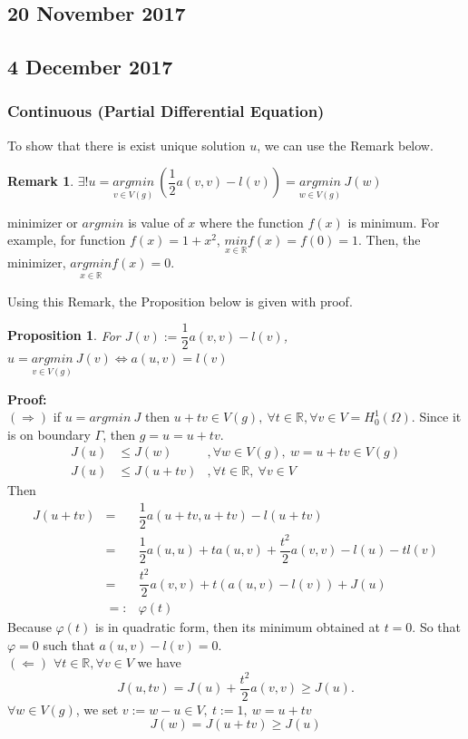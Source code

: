 \documentclass[a4paper,10pt]{article}
\newtheorem{remark}{Remark}[]
\newtheorem{prop}{Proposition}
\begin{document}
\subsection{20 November 2017}

\subsection{4 December 2017}

\subsubsection{Continuous (Partial Differential Equation)}
To show that there is exist unique solution $ u $, we can use the Remark below. 
\begin{remark}
	$ \exists ! u = \underset{v \in V(g)}{argmin} \ (\dfrac{1}{2} a(v,v)-l(v)) = \underset{w \in V(g)}{argmin} \ J(w)$
\end{remark}

minimizer or $ argmin $ is value of $ x $ where the function $ f(x) $ is minimum. For example, for function $ f(x)=1+x^2 $, $ \underset{x \in \mathbb{R}}{min} f(x) = f(0) =1 $. Then, the minimizer, $ \underset{x \in \mathbb{R}}{argmin} f(x) = 0 $.

Using this Remark, the Proposition below is given with proof.
\begin{prop}
	For $ J(v) := \dfrac{1}{2} a(v,v) -l (v) $,
	$ u = \underset{v \in V(g)}{argmin} \ J(v) \iff a(u,v)=l(v) $
\end{prop}

\textbf{Proof:}\\
$ (\Rightarrow) $ if $ u = argmin \ J $ then $ u+tv \in V(g) , \ \forall t \in \mathbb{R}, \forall v \in V = H_{0}^{1} (\Omega) $. Since it is on boundary $ \Gamma $, then $ g=u=u+tv $.
\begin{eqnarray}\nonumber
J(u) &\leq J(w) &, \forall w \in V(g), \ w=u+tv \in V(g)\\ \nonumber
J(u) &\leq J(u+tv) &, \forall t \in \mathbb{R}, \ \forall v \in V
\end{eqnarray}
Then
\begin{eqnarray}\nonumber
J(u+tv) &=& \dfrac{1}{2} a(u+tv,u+tv)-l(u+tv)\\ \nonumber
&=& \dfrac{1}{2} a(u,u) + t a(u,v) + \dfrac{t^2}{2} a (v,v) - l(u) - t l(v)\\ \nonumber
&=& \dfrac{t^2}{2} a (v,v) + t (a(u,v) - l(v)) + J(u)\\ \nonumber
&=:& \varphi(t)
\end{eqnarray}
Because $ \varphi(t) $ is in quadratic form, then its minimum obtained at $ t=0 $. So that $ \varphi =0 $ such that $ a(u,v) - l(v) =0 $.\\
$ (\Leftarrow) $ $ \forall t \in \mathbb{R}, \forall v \in V $ we have
\begin{equation}\nonumber
J(u,tv) = J(u) + \dfrac{t^2}{2} a(v,v) \geq J(u).
\end{equation}
$ \forall w \in V(g) $, we set $ v := w -u \in V , \ t:=1 , \ w=u+tv $
\begin{equation}\nonumber
J(w) = J(u+tv) \geq J(u)
\end{equation}
\end{document}
